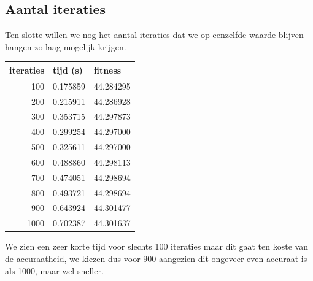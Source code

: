\documentclass[a4paper]{article}
\begin{document}
\subsection{Aantal iteraties}
Ten slotte willen we nog het aantal iteraties dat we op eenzelfde waarde blijven hangen zo laag mogelijk krijgen.\par
\begin{centering}
\begin{tabu}{r|l|l}
iteraties&tijd (s)&fitness\\
\hline
\rowfont{\color{red}}100&0.175859&44.284295\\
200&0.215911&44.286928\\
300&0.353715&44.297873\\
400&0.299254&44.297000\\
500&0.325611&44.297000\\
600&0.488860&44.298113\\
700&0.474051&44.298694\\
800&0.493721&44.298694\\
\rowfont{\color{red}}900&0.643924&44.301477\\
1000&0.702387&44.301637\\
\end{tabu}

\end{centering}\par
We zien een zeer korte tijd voor slechts 100 iteraties maar dit gaat ten koste van de accuraatheid, we kiezen dus voor 900 aangezien dit ongeveer even accuraat is als 1000, maar wel sneller.
\end{document}
